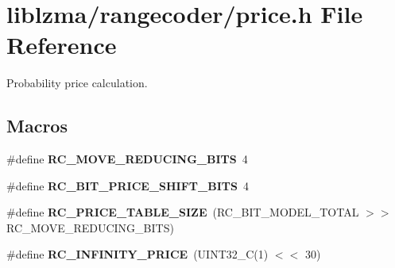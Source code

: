 \section{liblzma/rangecoder/price.h File Reference}
\label{price_8h}


Probability price calculation.  


\subsection*{Macros}
\begin{DoxyCompactItemize}
\item 
\#define {\bfseries R\-C\-\_\-\-M\-O\-V\-E\-\_\-\-R\-E\-D\-U\-C\-I\-N\-G\-\_\-\-B\-I\-T\-S}~4\label{price_8h_a4d38936a14ae066d7eaa2d801ffa5403}

\item 
\#define {\bfseries R\-C\-\_\-\-B\-I\-T\-\_\-\-P\-R\-I\-C\-E\-\_\-\-S\-H\-I\-F\-T\-\_\-\-B\-I\-T\-S}~4\label{price_8h_af103bd94e53fb3716daae7232e264f25}

\item 
\#define {\bfseries R\-C\-\_\-\-P\-R\-I\-C\-E\-\_\-\-T\-A\-B\-L\-E\-\_\-\-S\-I\-Z\-E}~(R\-C\-\_\-\-B\-I\-T\-\_\-\-M\-O\-D\-E\-L\-\_\-\-T\-O\-T\-A\-L $>$$>$ R\-C\-\_\-\-M\-O\-V\-E\-\_\-\-R\-E\-D\-U\-C\-I\-N\-G\-\_\-\-B\-I\-T\-S)\label{price_8h_a76af79ce948dc0d68436f2ef0c3eee6c}

\item 
\#define {\bfseries R\-C\-\_\-\-I\-N\-F\-I\-N\-I\-T\-Y\-\_\-\-P\-R\-I\-C\-E}~(U\-I\-N\-T32\-\_\-\-C(1) $<$$<$ 30)\label{price_8h_abb630554054926c3c682496bd6679feb}

\end{DoxyCompactItemize}
